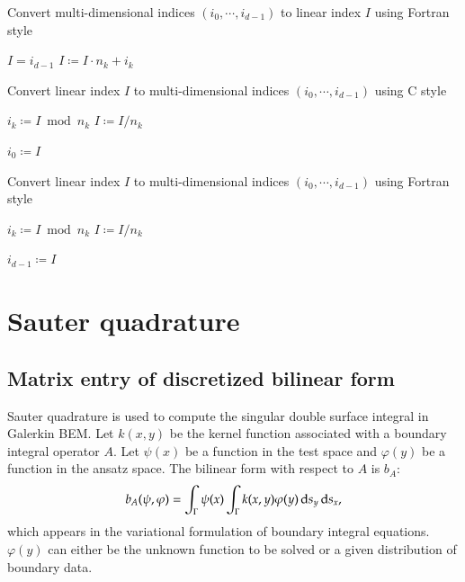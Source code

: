 \documentclass[11pt, a4paper]{article}
\begin{document}
\begin{breakablealgorithm}
  \caption{Convert multi-dimensional indices $(i_0,\cdots,i_{d-1})$ to linear index $I$ using Fortran style}
  \begin{algorithmic}[1]
    \State $I = i_{d-1}$
      \State $I \coloneqq I \cdot n_k + i_k$
    \EndFor
  \end{algorithmic}
\end{breakablealgorithm}

\begin{breakablealgorithm}
  \caption{Convert linear index $I$ to multi-dimensional indices $(i_0,\cdots,i_{d-1})$ using C style}
  \begin{algorithmic}[1]
      \State $i_{k} \coloneqq I \bmod n_k$
      \State $I \coloneqq I/n_k$
    \EndFor

    \State $i_0 \coloneqq I$
  \end{algorithmic}
\end{breakablealgorithm}

\begin{breakablealgorithm}
  \caption{Convert linear index $I$ to multi-dimensional indices $(i_0,\cdots,i_{d-1})$ using Fortran style}
  \begin{algorithmic}[1]
      \State $i_{k} \coloneqq I \bmod n_k$
      \State $I \coloneqq I/n_k$
    \EndFor

    \State $i_{d-1} \coloneqq I$
  \end{algorithmic}
\end{breakablealgorithm}

\section{Sauter quadrature}
\label{sec:sauter-quad}

\subsection{Matrix entry of discretized bilinear form}

Sauter quadrature is used to compute the singular double surface integral in Galerkin BEM.
Let $k(x,y)$ be the kernel function associated with a boundary integral operator $A$. Let
$\psi(x)$ be a function in the test space and $\varphi(y)$ be a function in the ansatz
space. The bilinear form with respect to $A$ is $b_A$:
\begin{equation}
  \label{eq:bem-bilinear-form-general}
  b_A(\psi, \varphi) = \int_{\Gamma}\psi(x)\int_{\Gamma}k(x,y)\varphi(y) \,\mathrm{d} s_y \,\mathrm{d} s_x,
\end{equation}
which appears in the variational formulation of boundary integral equations. $\varphi(y)$
can either be the unknown function to be solved or a given distribution of boundary data.
\end{document}
